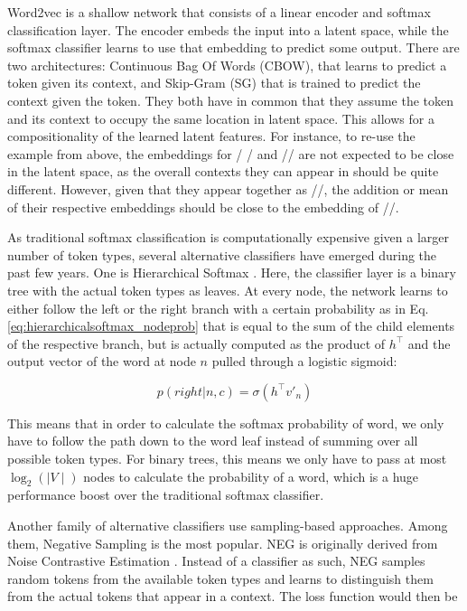 \documentclass[6pt]{article}
\begin{document}
Word2vec is a shallow network that consists of a linear encoder and softmax classification layer. The encoder embeds the input into a latent space, while the softmax classifier learns to use that embedding to predict some output. There are two architectures: Continuous Bag Of Words (CBOW), that learns to predict a token given its context, and Skip-Gram (SG) that is trained to predict the context given the token. They both have in common that they assume the token and its context to occupy the same location in latent space. This allows for a compositionality of the learned latent features. For instance, to re-use the example from above, the embeddings for / / and // are not expected to be close in the latent space, as the overall contexts they can appear in should be quite different. However, given that they appear together as //, the addition or mean of their respective embeddings should be close to the embedding of //.

As traditional softmax classification is computationally expensive given a larger number of token types, several alternative classifiers have emerged during the past few years. One is Hierarchical Softmax \citep[HS,][]{morin2005hierarchical}. Here, the classifier layer is a binary tree with the actual token types as leaves. At every node, the network learns to either follow the left or the right branch with a certain probability as in Eq. \ref{eq:hierarchicalsoftmax_nodeprob} that is equal to the sum of the child elements of the respective  branch, but is actually computed as the product of $h^\top$ and the output vector of the word at node $n$ pulled through a logistic sigmoid:

\begin{equation}
p(right|n,c) = \sigma(h^\top v'_n) 
\label{eq:hierarchicalsoftmax_nodeprob}
\end{equation}

This means that in order to calculate the softmax probability of word, we only have to follow the path down to the word leaf instead of summing over all possible token types. For binary trees, this means we only have to pass at most $\log_2(\mid V\mid)$ nodes to calculate the probability of a word, which is a huge performance boost over the traditional softmax classifier. 

Another family of alternative classifiers use sampling-based approaches. Among them, Negative Sampling \citep[NEG,][]{goldberg2014word2vec} is the most popular. NEG is originally derived from Noise Contrastive Estimation \citep{gutmann2010noise,mnih2012fast}. Instead of a classifier as such, NEG samples random tokens from the available token types and learns to distinguish them from the actual tokens that appear in a context. The loss function would then be
\end{document}

